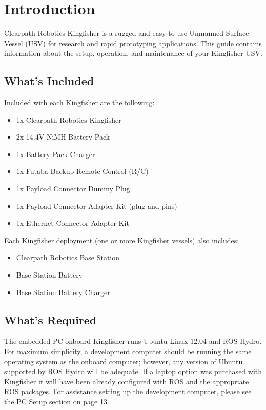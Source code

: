 \documentclass[]{clearpath-latex/clearpath-manual}
\begin{document}
\tableofcontents

\section{Introduction}
Clearpath Robotics Kingfisher is a rugged and easy-to-use Unmanned Surface Vessel (USV) for research and rapid prototyping applications. This guide contains information about the setup, operation, and maintenance of your Kingfisher USV.

\subsection{What's Included}

Included with each Kingfisher are the following:

\begin{itemize}[nolistsep]
	\item 1x Clearpath Robotics Kingfisher
	\item 2x 14.4V NiMH Battery Pack
	\item 1x Battery Pack Charger
	\item 1x Futaba Backup Remote Control (R/C)
	\item 1x Payload Connector Dummy Plug
	\item 1x Payload Connector Adapter Kit (plug and pins)
	\item 1x Ethernet Connector Adapter Kit
\end{itemize}

Each Kingfisher deployment (one or more Kingfisher vessels) also includes:

\begin{itemize}[nolistsep]
	\item Clearpath Robotics Base Station
	\item Base Station Battery
	\item Base Station Battery Charger
\end{itemize}

\subsection{What's Required}

The embedded PC onboard Kingfisher runs Ubuntu Linux 12.04 and ROS Hydro. For maximum simplicity, a development computer should be running the same operating system as the onboard computer; however, any version of Ubuntu supported by ROS Hydro will be adequate. If a laptop option was purchased with Kingfisher it will have been already configured with ROS and the appropriate ROS packages. For assistance setting up the development computer, please see the PC Setup section on page 13.
\end{document}
